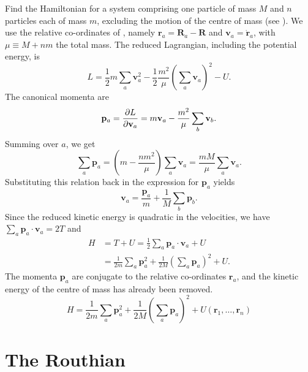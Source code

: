 \begin{problem}[title={Hamiltonian of one heavy and n particles}]
{
Find the Hamiltonian for a system comprising one particle of mass $M$ and $n$ particles each of mass $m$, excluding the motion of the centre of mass (see ).
}
{
We use the relative co-ordinates of , namely $\mathbf{r}_a = \mathbf{R}_a - \mathbf{R}$ and $\mathbf{v}_a = \Dot{\mathbf{r}}_a$, with $\mu \equiv M + nm$ the total mass. The reduced Lagrangian, including the potential energy, is
\begin{equation*}
    L = \frac{1}{2}m\sum_a\mathbf{v}_a^2 - \frac{1}{2}\frac{m^2}{\mu}\left(\sum_a\mathbf{v}_a\right)^2 - U.
\end{equation*}
The canonical momenta are
\begin{equation*}
    \mathbf{p}_a = \frac{\partial L}{\partial \mathbf{v}_a} = m\mathbf{v}_a - \frac{m^2}{\mu}\sum_b\mathbf{v}_b.
\end{equation*}
Summing over $a$, we get
\begin{equation*}
    \sum_a\mathbf{p}_a = \left(m - \frac{nm^2}{\mu}\right)\sum_a\mathbf{v}_a = \frac{mM}{\mu}\sum_a\mathbf{v}_a.
\end{equation*}
Substituting this relation back in the expression for $\mathbf{p}_a$ yields
\begin{equation*}
    \mathbf{v}_a = \frac{\mathbf{p}_a}{m} + \frac{1}{M}\sum_b\mathbf{p}_b.
\end{equation*}
Since the reduced kinetic energy is quadratic in the velocities, we have $\sum_a\mathbf{p}_a\cdot\mathbf{v}_a = 2T$ and
\begin{align*}
    H &= T + U = \frac{1}{2}\sum_a\mathbf{p}_a\cdot\mathbf{v}_a + U \\
    &= \frac{1}{2m}\sum_a\mathbf{p}_a^2 + \frac{1}{2M}\left(\sum_a\mathbf{p}_a\right)^2 + U.
\end{align*}
The momenta $\mathbf{p}_a$ are conjugate to the relative co-ordinates $\mathbf{r}_a$, and the kinetic energy of the centre of mass has already been removed.
}
{
\begin{equation*}
    H = \frac{1}{2m}\sum_a\mathbf{p}_a^2 + \frac{1}{2M}\left(\sum_a\mathbf{p}_a\right)^2 + U(\mathbf{r}_1, \ldots, \mathbf{r}_n)
\end{equation*}
}
\end{problem}

\section{The Routhian}

